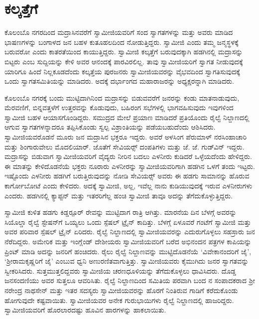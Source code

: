 
\chapter{ಕಲ್ಕತ್ತೆಗೆ }

 ಕೊಲಂಬೊ ನಗರದಿಂದ ಮದ್ರಾಸಿನವರೆಗೆ ಸ್ವಾಮೀಜಿಯವರಿಗೆ ಸಂದ ಸ್ವಾಗತಗಳನ್ನು ಮತ್ತು ಅವರು ಮಾಡಿದ ಭಾಷಣಗಳನ್ನು ಬಂಗಾಳದ ಜನ ಬಹಳ ಕುತೂಹಲದಿಂದ ನೋಡುತ್ತಿದ್ದರು. ಸ್ವಾಮೀಜಿ ಎಂದು ತಮ್ಮ ಜನ್ಮಸ್ಥಳಕ್ಕೆ ಬರುವರೋ ಎಂದು ಕಾತರತೆಯಿಂದ ಕಾಯುತ್ತಿದ್ದರು. ಸ್ವಾಮೀಜಿ ಕಲ್ಕತ್ತೆಗೆ ಬರುವುದಕ್ಕಾಗಿ ಹಡಗಿನಲ್ಲಿ ಮದ್ರಾಸನ್ನು ಬಿಟ್ಟರು ಎಂಬ ಸುದ್ದಿಯನ್ನು ಕೇಳಿ ಅವರ ಆನಂದಕ್ಕೆ ಪಾರವಿರಲಿಲ್ಲ. ತಾವು ಸ್ವಾಮೀಜಿಯರಿಗೆ ಸ್ವಾಗತ ನೀಡುವುದಕ್ಕೆ ಯಾರಿಗೂ ಹಿಂದೆ ನಿಲ್ಲಕೂಡದೆಂದು ಕಲ್ಕತ್ತೆಯ ಪುರಜನರು ಸ್ವಾಮೀಜಿಯವರನ್ನು ವೈಭವದಿಂದ ಸ್ವಾಗತಿಸುವುದಕ್ಕೆ ಒಂದು ಸ್ವಾಗತಸಮಿತಿಯನ್ನು ಮಾಡಿದರು. ಅದಕ್ಕೆ ದರ್ಭಾಂಗದ ಮಹಾರಾಜರನ್ನು ಅಧ್ಯಕ್ಷರನ್ನಾಗಿ ಮಾಡಿದರು. 

 ಕೊಲಂಬೊ ನಗರಕ್ಕೆ ಬಂದು ಮುಟ್ಟಿದಾಗಿನಿಂದ ಮದ್ರಾಸನ್ನು ಬಿಡುವವರೆಗೆ ಜನರನ್ನು ಕಂಡು ಮಾತನಾಡುವುದು, ಮೆರವಣಿಗೆ, ಬಿನ್ನವತ್ತಳೆಗೆ ಉತ್ತರವನ್ನು ಕೊಡುವುದು, ಬಹಿರಂಗ ಸಭೆಗಳಲ್ಲಿ ಭಾಗವಹಿಸುವುದು ಇವುಗಳಿಂದ ಸ್ವಾಮೀಜಿ ಬಹಳ ಆಯಾಸಗೊಂಡಿದ್ದರು. ಸಮುದ್ರದ ಮೇಲೆ ಪ್ರಯಾಣ ಮಾಡಿದರೆ ಪ್ರತಿಯೊಂದು ರೈಲ್ವೆ ನಿಲ್ದಾಣದಲ್ಲಿ ಆಗುವ ಸ್ವಾಗತಗಳನ್ನಾದರೂ ತಪ್ಪಿಸಿಕೊಂಡು ಸ್ವಲ್ಪ ವಿಶ್ರಾಂತಿಯನ್ನು ಪಡೆಯಬಹುದೆಂದು ಆಶಿಸಿದರು. ಸ್ವಾಮೀಜಿಯವರೊಡನೆ ಮೂರು ಜನ ಮದ್ರಾಸಿನ ಭಕ್ತರೂ ಇದ್ದರು. ಅವರೆ ಅಳಸಿಂಗ ಪೆರುಮಾಳ್ ನರಸಿಂಹಾಚಾರಿ ಮತ್ತು ಶಿಂಗಾರುವೇಲು ಮೊದಲಿಯಾರ್. ಜೊತೆಗೆ ಸೇವಿಯರ್ಸ್‍‍ ದಂಪತಿಗಳು ಮತ್ತು ಜೆ. ಜೆ. ಗುಡ್‍ವಿನ್ ಇದ್ದರು. ಮದ್ರಾಸನ್ನು ಬಿಡುವಾಗ ಸ್ವಾಮೀಜಿಯವರಿಗೆ ವೈದ್ಯರು ನೀರಿನ ಬದಲು ಎಳನೀರು ಕುಡಿದರೆ ಒಳ್ಳೆಯದೆಂದು ಹೇಳಿದ್ದರು. ಈ ಮಾತನ್ನು ಕೇಳಿದೊಡನೆಯೆ ಭಕ್ತರು ನೂರಾರು ಎಳನೀರನ್ನು ಸ್ವಾಮೀಜಿಯವರಿಗಾಗಿ ಹಡಗಿನ ಒಳಗೆ ತಂದು ಇಟ್ಟರು. ಇಷ್ಟೊಂದು ಎಳನೀರು ಹಡಗಿಗೆ ಬರುತ್ತಿರುವುದನ್ನು ನೋಡಿ ಸೇವಿಯರ್ಸ್‍‍ ಅವರು ಈ ಹಡಗು ಸಾಮಾನನ್ನು ಹೊರುವ ಕಾರ್ಗೋಬೋಟೆ ಎಂದು ಕೇಳಿದರು. ಅದಕ್ಕೆ ಸ್ವಾಮೀಜಿ, ಅಲ್ಲ, ಇವೆಲ್ಲ ನಾನು ಕುಡಿಯುವುದಕ್ಕೆ ಇರುವ ಎಳನೀರುಗಳು ಎಂದರು. ಹಡಗಿನಲ್ಲಿ ಕ್ಯಾಪ್ಟನ್ ಮತ್ತು ಇತರರಿಗೆಲ್ಲ ಹಂಚಿ ಸ್ವಾಮೀಜಿ ತಾವೂ ಅದನ್ನು ತೆಗೆದುಕೊಳ್ಳುತ್ತಿದ್ದರು. 

 ಸ್ವಾಮೀಜಿ ಕುಳಿತ ಹಡಗು ಕಿಡ್ಡರ್‍ಪೂರ್ ರೇವನ್ನು ಮುಟ್ಟಿದಾಗ ರಾತ್ರಿ ಆಗಿತ್ತು. ಮಾರನೆಯ ದಿನ ಬೆಳಗ್ಗೆ ಅವರನ್ನು ಸಿಯೊಲ್ಡಾ ರೈಲ್ವೆ ಸ್ಟೇಷನ್‍ಗೆ ಒಯ್ಯಲು ಒಂದು ಸ್ಪೆಷಲ್ ಟ್ರೈನ್ ಕಾದಿತ್ತು. ಬೆಳಗ್ಗೆ ಏಳೂವರೆ ಗಂಟೆಗೆ ಸ್ವಾಮೀಜಿ ಮತ್ತು ಅವರ ಪರಿವಾರ ಸ್ಪೆಷಲ್ ಟ್ರೈನ್ ಏರಿದರು. ರೈಲ್ವೆ ನಿಲ್ದಾಣದಲ್ಲಿ ಸ್ವಾಮೀಜಿಯವರನ್ನು ಎದುರುಗೊಳ್ಳಲು ಸಹಸ್ರಾರು ಜನ ನೆರೆದಿದ್ದರು. ಅಮೇರಿಕ ಮತ್ತು ಇಂಗ್ಲೆಂಡ್ ದೇಶೀಯರು ಸ್ವಾಮೀಜಿಯವರಿಗೆ ಬರೆದ ಅಭಿನಂದನ ಪತ್ರಗಳ ಕಾಪಿಯನ್ನು ಪ್ರಿಂಟ್ ಮಾಡಿ ಅದನ್ನು ಜನರಿಗೆ ಹಂಚಿದರು. ರೈಲು ರೈಲ್ವೆ ನಿಲ್ದಾಣವನ್ನು ಮುಟ್ಟಿದೊಡನೆಯೆ ‘ವಿವೇಕಾನಂದರಿಗೆ ಜೈ’, ‘ಶ‍್ರೀರಾಮಕೃಷ್ಣರಿಗೆ ಜೈ’ ಎಂಬುವ ಧ್ವನಿ ಅಣುರಣಿತವಾಗುತ್ತಿತ್ತು. ಸ್ವಾಮೀಜಿಯವರು ಕೈಮುಗಿದು ಜನರ ಸ್ವಾಗತವನ್ನು ಸ್ವೀಕರಿಸಿದರು. ಸುತ್ತಮುತ್ತಲಿದ್ದವರು ಸ್ವಾಮೀಜಿಯ ಚರಣಧೂಳಿಯನ್ನು ತೆಗೆದುಕೊಳ್ಳಲು ಧಾವಿಸಿದರು. ದೊಡ್ಡ ಜನಸಂದಣಿಯು ಅವರ ಸುತ್ತಲೂ ಆವರಿಸಿತು. ರೈಲ್ವೆ ನಿಲ್ದಾಣದಿಂದ ಸಮಿತಿಯ ಪರವಾಗಿ ಬಂದ  ನ ಸಂಪಾದಕರಾದ ಶ‍್ರೀ ನರೇಂದ್ರ ನಾಥಸೇನ್ ಮತ್ತು ಇತರ ಸದಸ್ಯರು ಸ್ವಾಮೀಜಿಯವರನ್ನು ಹೊರಗೆ ನಿಂತಿರುವ ಗಾಡಿಗೆ ಕರೆದುಕೊಂಡು ಹೋಗುವುದೇ ಕಷ್ಟವಾಯಿತು. ಸ್ವಾಮೀಜಿಯವರ ಅನೇಕ ಗುರುಭಾಯಿಗಳು ರೈಲ್ವೆ ನಿಲ್ದಾಣದಲ್ಲಿ ಹಾಜರಿದ್ದರು. ಸ್ವಾಮೀಜಿಯವರಿಗೆ ಹೊರಲಾರದಷ್ಟು ಹೂವಿನ ಹಾರಗಳನ್ನು ಹಾಕಲಾಯಿತು. 

